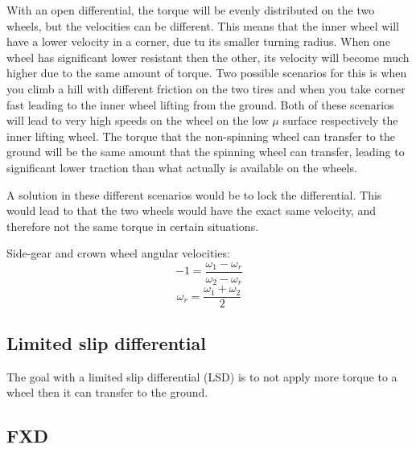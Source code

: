 With an open differential, the torque will be evenly distributed on the two wheels, but the velocities can be different. This means that the inner wheel will have a lower velocity in a corner, due tu its smaller turning radius. When one wheel has significant lower resistant then the other, its velocity will become much higher due to the same amount of torque. Two possible scenarios for this is when you climb a hill with different friction on the two tires and when you take corner fast leading to the inner wheel lifting from the ground. Both of these scenarios will lead to very high speeds on the wheel on the low $ \mu $ surface respectively the inner lifting wheel. The torque that the non-spinning wheel can transfer to the ground will be the same amount that the spinning wheel can transfer, leading to significant lower traction than what actually is available on the wheels.

A solution in these different scenarios would be to lock the differential. This would lead to that the two wheels would have the exact same velocity, and therefore not the same torque in certain situations. 

Side-gear and crown wheel angular velocities:
\begin{equation}
	-1 = \frac{\omega_{1} - \omega_{r}}{\omega_{2} - \omega_{r}}
\end{equation}
\begin{equation}
	\omega_{r} = \frac{\omega_{1} + \omega_{2}}{2}
\end{equation}



\subsection{Limited slip differential}

The goal with a limited slip differential (LSD) is to not apply more torque to a wheel then it can transfer to the ground. 

\subsection{FXD}